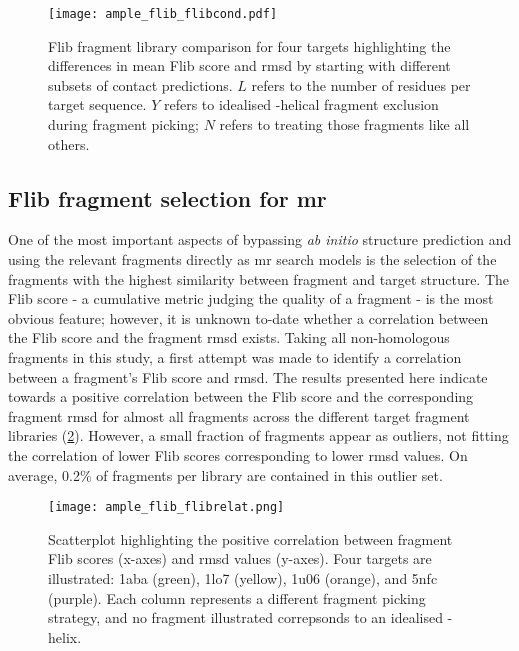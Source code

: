 \begin{figure}[H]
	\centering
	\texttt{[image: ample\_flib\_flibcond.pdf]}
	\caption[Flib fragment library comparison]{Flib fragment library comparison for four targets highlighting the differences in mean Flib score and \gls{rmsd} by starting with different subsets of contact predictions. $L$ refers to the number of residues per target sequence. $Y$ refers to idealised \textalpha-helical fragment exclusion during fragment picking; $N$ refers to treating those fragments like all others.}
	\label{fig:ample_flib_flibcond}
\end{figure}

\subsection{Flib fragment selection for \acrlong{mr}}

One of the most important aspects of bypassing \textit{ab initio} structure prediction and using the relevant fragments directly as \gls{mr} search models is the selection of the fragments with the highest similarity between fragment and target structure. The Flib score - a cumulative metric judging the quality of a fragment - is the most obvious feature; however, it is unknown to-date whether a correlation between the Flib score and the fragment \gls{rmsd} exists. Taking all non-homologous fragments in this study, a first attempt was made to identify a correlation between a fragment's Flib score and \gls{rmsd}. The results presented here indicate towards a positive correlation between the Flib score and the corresponding fragment \gls{rmsd} for almost all fragments across the different target fragment libraries (\cref{fig:ample_flib_flibrelat}). However, a small fraction of fragments appear as outliers, not fitting the correlation of lower Flib scores corresponding to lower \gls{rmsd} values. On average, 0.2\% of fragments per library are contained in this outlier set.

\begin{figure}[H]
	\centering
	\texttt{[image: ample\_flib\_flibrelat.png]}
	\caption[Correlation analysis for Flib score and \gls{rmsd}]{Scatterplot highlighting the positive correlation between fragment Flib scores (x-axes) and \gls{rmsd} values (y-axes). Four targets are illustrated: 1aba (green), 1lo7 (yellow), 1u06 (orange), and 5nfc (purple). Each column represents a different fragment picking strategy, and no fragment illustrated correpsonds to an idealised \textalpha-helix.}
	\label{fig:ample_flib_flibrelat}
\end{figure}

